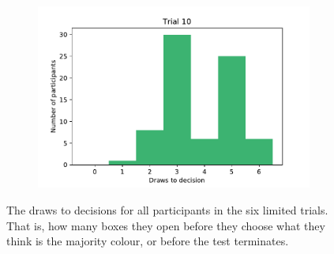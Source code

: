 \begin{figure}
\begin{subfigure}{0.48\textwidth}
    \end{subfigure}
    \hfill
    \begin{subfigure}{0.48\textwidth}
        \includegraphics[scale=0.36]{pictures/dtd10_histogram.pdf}
    \end{subfigure}
    \caption[Draws to decision in the limited trials]{The draws to decisions for all participants in the six limited trials. That is, how many boxes they open before they choose what they think is the majority colour, or before the test terminates.}
    \label{fig:dtd_limited_trials}
\end{figure}


